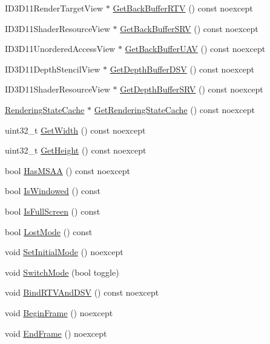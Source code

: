 \begin{DoxyCompactItemize}
\item 
I\+D3\+D11\+Render\+Target\+View $\ast$ \hyperlink{classmage_1_1_renderer_a19fed9809f31ff427440bbf6a167805e}{Get\+Back\+Buffer\+R\+TV} () const noexcept
\item 
I\+D3\+D11\+Shader\+Resource\+View $\ast$ \hyperlink{classmage_1_1_renderer_af0f19d31c5f01b79c2268128fde95206}{Get\+Back\+Buffer\+S\+RV} () const noexcept
\item 
I\+D3\+D11\+Unordered\+Access\+View $\ast$ \hyperlink{classmage_1_1_renderer_aa7e0a472b588985e3df51f1a528d08a7}{Get\+Back\+Buffer\+U\+AV} () const noexcept
\item 
I\+D3\+D11\+Depth\+Stencil\+View $\ast$ \hyperlink{classmage_1_1_renderer_a0e292945b845c16cc4fa113ecb6d14c5}{Get\+Depth\+Buffer\+D\+SV} () const noexcept
\item 
I\+D3\+D11\+Shader\+Resource\+View $\ast$ \hyperlink{classmage_1_1_renderer_a1e76970e43b0a4b734043f179d5f146d}{Get\+Depth\+Buffer\+S\+RV} () const noexcept
\item 
\hyperlink{structmage_1_1_rendering_state_cache}{Rendering\+State\+Cache} $\ast$ \hyperlink{classmage_1_1_renderer_a5e48da6152df0ddfa52c079f77ee6873}{Get\+Rendering\+State\+Cache} () const noexcept
\item 
uint32\+\_\+t \hyperlink{classmage_1_1_renderer_a140938e7d5f576163d39ce249ebda99f}{Get\+Width} () const noexcept
\item 
uint32\+\_\+t \hyperlink{classmage_1_1_renderer_adc6940516d809d1916c627d6ce3837fe}{Get\+Height} () const noexcept
\item 
bool \hyperlink{classmage_1_1_renderer_a2ed9e9e39f01fa58769edd82ee1adcf8}{Has\+M\+S\+AA} () const noexcept
\item 
bool \hyperlink{classmage_1_1_renderer_a1de1804c1eedae7dc12435a520a10b9c}{Is\+Windowed} () const
\item 
bool \hyperlink{classmage_1_1_renderer_a5ae3220e19c68f47a8e4d55e3ced4694}{Is\+Full\+Screen} () const
\item 
bool \hyperlink{classmage_1_1_renderer_afdde83a1e2bc9288f000fb2575c525d0}{Lost\+Mode} () const
\item 
void \hyperlink{classmage_1_1_renderer_aff4e08af2ab697c53f1ede6546a86d19}{Set\+Initial\+Mode} () noexcept
\item 
void \hyperlink{classmage_1_1_renderer_a9004ab608659188900c808eacb5f873c}{Switch\+Mode} (bool toggle)
\item 
void \hyperlink{classmage_1_1_renderer_a97b7b1563939688072fa94341d29cc2c}{Bind\+R\+T\+V\+And\+D\+SV} () const noexcept
\item 
void \hyperlink{classmage_1_1_renderer_a3eadaa4b37cd9ad9a3da9f72879b0722}{Begin\+Frame} () noexcept
\item 
void \hyperlink{classmage_1_1_renderer_ac4b5290432db9c566c1accd98c311e0e}{End\+Frame} () noexcept
\end{DoxyCompactItemize}
